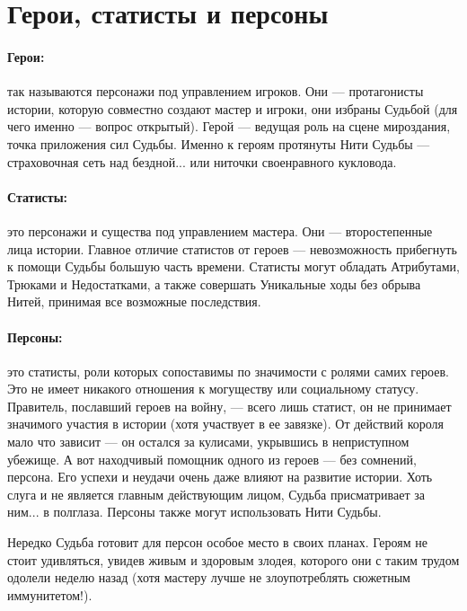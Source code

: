 \section{Герои, статисты и персоны}
\paragraph{Герои:} так называются персонажи под управлением игроков. Они — протагонисты истории, которую совместно создают мастер и игроки, они избраны Судьбой (для чего именно — вопрос открытый). Герой — ведущая роль на сцене мироздания, точка приложения сил Судьбы. Именно к героям протянуты Нити Судьбы — страховочная сеть над бездной... или ниточки своенравного кукловода.
\paragraph{Статисты:} это персонажи и существа под управлением мастера. Они — второстепенные лица истории. Главное отличие статистов от героев — невозможность прибегнуть к помощи Судьбы большую часть времени. Статисты могут обладать Атрибутами, Трюками и Недостатками, а также совершать Уникальные ходы без обрыва Нитей, принимая все возможные последствия.
\paragraph{Персоны:} это статисты, роли которых сопоставимы по значимости с ролями самих героев. Это не имеет никакого отношения к могуществу или социальному статусу. Правитель, пославший героев на войну, — всего лишь статист, он не принимает значимого участия в истории (хотя участвует в ее завязке). От действий короля мало что зависит — он остался за кулисами, укрывшись в неприступном убежище. А вот находчивый помощник одного из героев — без сомнений, персона. Его успехи и неудачи очень даже влияют на развитие истории. Хоть слуга и не является главным действующим лицом, Судьба присматривает за ним... в полглаза. Персоны также могут использовать Нити Судьбы.

\begin{tcolorbox}
    Нередко Судьба готовит для персон особое место в своих планах. Героям не стоит удивляться, увидев живым и здоровым злодея, которого они с таким трудом одолели неделю назад (хотя мастеру лучше не злоупотреблять сюжетным иммунитетом!).
\end{tcolorbox} 


